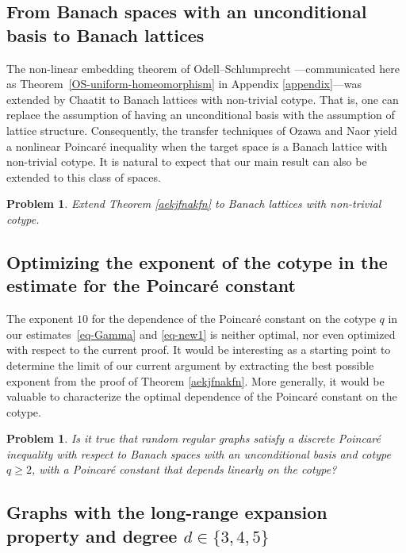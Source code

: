 \documentclass[11pt,leqno]{amsart}
\newtheorem{problem}[theorem]{Problem}
\theoremstyle{remark}
\theoremstyle{plain}
\begin{document}
\subsection{From Banach spaces with an unconditional basis to Banach lattices}

The non-linear embedding theorem of Odell--Schlumprecht \cite[Theorem 2.1]{OS94}---communicated here as
Theorem~\ref{OS-uniform-homeomorphism} in Appendix \ref{appendix}---was extended by Chaatit \cite{Ch95}
to Banach lattices with non-trivial cotype. That is, one can replace the assumption of having an unconditional
basis with the assumption of lattice structure. Consequently, the transfer techniques of Ozawa \cite{Oz04}
and Naor \cite{Na14} yield a nonlinear Poincar\'{e} inequality when the target space is a Banach lattice
with non-trivial cotype. It is natural to expect that our main result can also be extended to this class of spaces.
\begin{problem} \label{pr-1}
Extend Theorem \ref{aekjfnakfn} to Banach lattices with non-trivial cotype.
\end{problem}

\subsection{Optimizing the exponent of the cotype in the estimate for the Poincar\'{e} constant}

The exponent $10$ for the dependence of the Poincar\'{e} constant on the cotype $q$ in our estimates~\eqref{eq-Gamma}
and \eqref{eq-new1} is neither optimal, nor even optimized with respect to the current proof. It would be interesting
as a starting point to determine the limit of our current argument by extracting the best possible exponent from
the proof of Theorem \ref{aekjfnakfn}. More generally, it would be valuable to characterize the optimal dependence
of the Poincar\'e constant on the cotype.
\begin{problem} \label{pr-2}
Is it true that random regular graphs satisfy a discrete Poincar\'{e} inequality with respect to Banach
spaces with an unconditional basis and cotype $q\geqslant 2$, with a Poincar\'{e} constant that depends
\emph{linearly} on the cotype?
\end{problem}

\subsection{Graphs with the long-range expansion property and degree $d\in \{3,4,5\}$}
\end{document}
